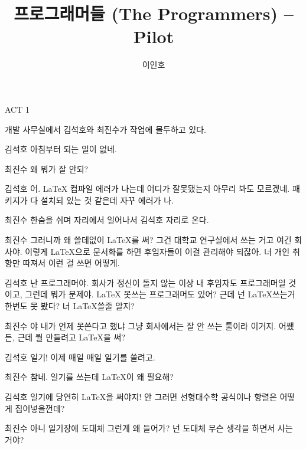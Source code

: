 \documentclass{screenplay}
\title{프로그래머들 (The Programmers) -- Pilot}
\author{이인호}
\begin{document}
    \coverpage
    
    ACT 1
    
    \fadein
    개발 사무실에서 김석호와 최진수가 작업에 몰두하고 있다. 
    \begin{dialogue}[짜증 내는 말투로]{김석호}
        아침부터 되는 일이 없네.
    \end{dialogue}
    \begin{dialogue}{최진수}
        왜 뭐가 잘 안되?
    \end{dialogue}
    \begin{dialogue}{김석호}
        어. LaTeX 컴파일 에러가 나는데 어디가 잘못됐는지 아무리 봐도 모르겠네. 패키지가 다 설치되 있는 것 같은데 자꾸 에러가 나. 
    \end{dialogue}
    최진수 한숨을 쉬며 자리에서 일어나서 김석호 자리로 온다.
    \begin{dialogue}[어이없다는 듯이]{최진수}
        그러니까 왜 쓸데없이 LaTeX를 써? 그건 대학교 연구실에서 쓰는 거고 여긴 회사야. 이렇게 LaTeX으로 문서화를 하면 후임자들이 이걸 관리해야 되잖아. 너 개인 취향만 따져서 이런 걸 쓰면 어떻게. 
    \end{dialogue}
    \begin{dialogue}[반색하며]{김석호}
        난 프로그래머야. 회사가 정신이 돌지 않는 이상 내 후임자도 프로그래머일 것이고, 그런데 뭐가 문제야. LaTeX 못쓰는 프로그래머도 있어?
        근데 넌 LaTeX쓰는거 한번도 못 봤다? 너 LaTeX쓸줄 알지?
    \end{dialogue}
    \begin{dialogue}{최진수}
        야 내가 언제 못쓴다고 했냐 그냥 회사에서는 잘 안 쓰는 툴이라 이거지.
        어쨌든, 근데 뭘 만들려고 LaTeX을 써?
    \end{dialogue}
    \begin{dialogue}[웃으며]{김석호}
        일기! 이제 매일 매일 일기를 쓸려고.
    \end{dialogue}
    \begin{dialogue}[황당하다는 듯이]{최진수}
        참네. 일기를 쓰는데 LaTeX이 왜 필요해?
    \end{dialogue}
    \begin{dialogue}[순진하게]{김석호}
        일기에 당연히 LaTeX을 써야지! 안 그러면 선형대수학 공식이나 항렬은 어떻게 집어넣을껀데?
    \end{dialogue}
    \begin{dialogue}{최진수}
        아니 일기장에 도대체 그런게 왜 들어가? 넌 도대체 무슨 생각을 하면서 사는 거야?
    \end{dialogue}
\end{document}
